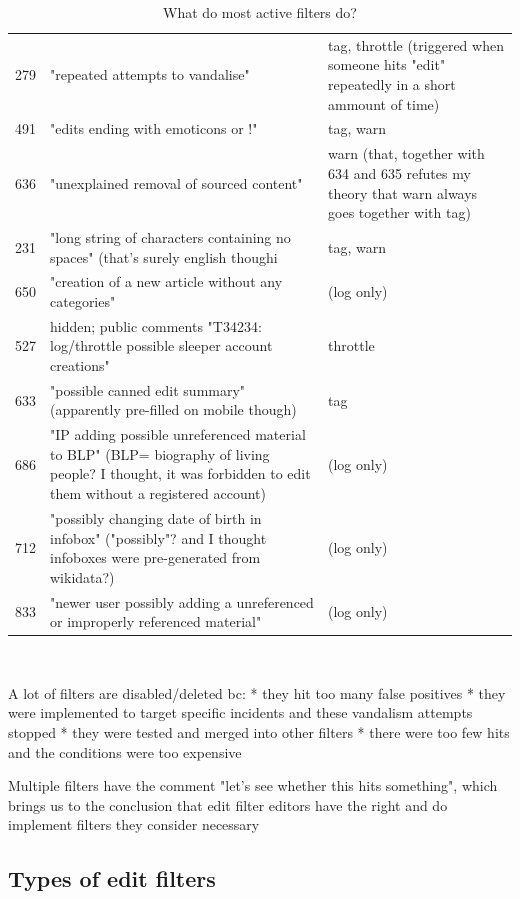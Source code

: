 \documentclass{sigchi}
\begin{document}
\begin{table}
\begin{tabular}{r p{10cm} p{5cm} }
      279 & "repeated attempts to vandalise" & tag, throttle (triggered when someone hits "edit" repeatedly in a short ammount of time) \\
      491 & "edits ending with emoticons or !" & tag, warn \\
      636 & "unexplained removal of sourced content" & warn (that, together with 634 and 635 refutes my theory that warn always goes together with tag) \\
      231 & "long string of characters containing no spaces" (that's surely english though^^) & tag, warn \\
      650 & "creation of a new article without any categories" & (log only) \\
      527 & hidden; public comments "T34234: log/throttle possible sleeper account creations" & throttle \\
      633 & "possible canned edit summary" (apparently pre-filled on mobile though) & tag \\
      686 & "IP adding possible unreferenced material to BLP" (BLP= biography of living people? I thought, it was forbidden to edit them without a registered account) & (log only) \\
      712 & "possibly changing date of birth in infobox" ("possibly"? and I thought infoboxes were pre-generated from wikidata?) & (log only) \\
      833 & "newer user possibly adding a unreferenced or improperly referenced material" & (log only) \\
  \end{tabular}
  \caption{What do most active filters do?}~\label{tab:most-active-actions}
\end{table}

A lot of filters are disabled/deleted bc:
* they hit too many false positives
* they were implemented to target specific incidents and these vandalism attempts stopped
* they were tested and merged into other filters
* there were too few hits and the conditions were too expensive

Multiple filters have the comment "let's see whether this hits something", which brings us to the conclusion that edit filter editors have the right and do implement filters they consider necessary


\subsection{Types of edit filters}
\end{document}
